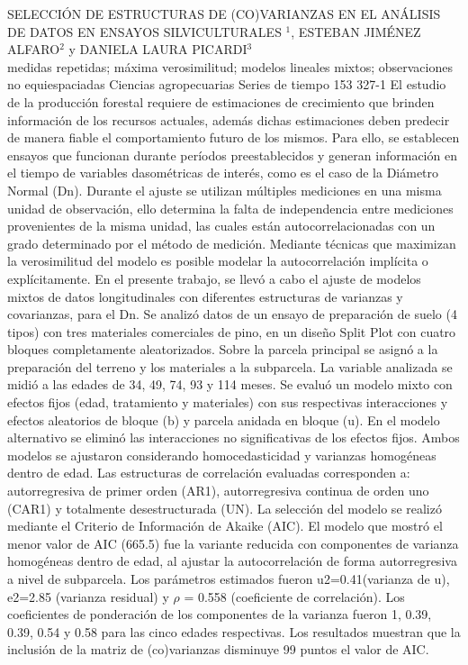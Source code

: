 \A
{SELECCIÓN DE ESTRUCTURAS DE (CO)VARIANZAS EN EL ANÁLISIS DE DATOS EN ENSAYOS SILVICULTURALES}
{$^1$, ESTEBAN JIMÉNEZ ALFARO$^2$ y DANIELA LAURA PICARDI$^3$}
{
\\}
{medidas repetidas; máxima verosimilitud; modelos lineales mixtos; observaciones no equiespaciadas} 
 {Ciencias agropecuarias} 
 {Series de tiempo} 
 {153} 
 {327-1}
{El estudio de la producción forestal requiere de estimaciones de crecimiento que brinden información de los recursos actuales, además dichas estimaciones deben predecir de manera fiable el comportamiento futuro de los mismos. Para ello, se establecen ensayos que funcionan durante períodos preestablecidos y generan información en el tiempo de variables dasométricas de interés, como es el caso de la Diámetro Normal (Dn). Durante el ajuste se utilizan múltiples mediciones en una misma unidad de observación, ello determina la falta de independencia entre mediciones provenientes de la misma unidad, las cuales están autocorrelacionadas con un grado determinado por el método de medición. Mediante técnicas que maximizan la verosimilitud del modelo es posible modelar la autocorrelación implícita o explícitamente. En el presente trabajo, se llevó a cabo el ajuste de modelos mixtos de datos longitudinales con diferentes estructuras de varianzas y covarianzas, para el Dn. Se analizó datos de un ensayo de preparación de suelo (4 tipos) con tres materiales comerciales de pino, en un diseño Split Plot con cuatro bloques completamente aleatorizados. Sobre la parcela principal se asignó a la preparación del terreno y los materiales a la subparcela. La variable analizada se midió a las edades de 34, 49, 74, 93 y 114 meses. Se evaluó un modelo mixto con efectos fijos (edad, tratamiento y materiales) con sus respectivas interacciones y efectos aleatorios de bloque (b) y parcela anidada en bloque (u). En el modelo alternativo se eliminó las interacciones no significativas de los efectos fijos. Ambos modelos se ajustaron considerando homocedasticidad y varianzas homogéneas dentro de edad. Las estructuras de correlación evaluadas corresponden a: autorregresiva de primer orden (AR1), autorregresiva continua de orden uno (CAR1) y totalmente desestructurada (UN). La selección del modelo se realizó mediante el Criterio de Información de Akaike (AIC). El modelo que mostró el menor valor de AIC (665.5) fue la variante reducida con componentes de varianza homogéneas dentro de edad, al ajustar la autocorrelación de forma autorregresiva a nivel de subparcela. Los parámetros estimados fueron u2=0.41(varianza de u), e2=2.85 (varianza residual) y $\rho$ = 0.558 (coeficiente de correlación). Los coeficientes de ponderación de los componentes de la varianza fueron 1, 0.39, 0.39, 0.54 y 0.58 para las cinco edades respectivas. Los resultados muestran que la inclusión de la matriz de (co)varianzas disminuye 99 puntos el valor de AIC.}
